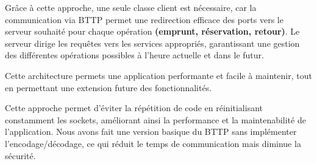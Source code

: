     \bigskip

    Grâce à cette approche, une seule classe client est nécessaire, car la communication via BTTP permet une
    redirection efficace des ports vers le serveur souhaité pour chaque opération \textbf{(emprunt, réservation, retour)}.
    Le serveur dirige les requêtes vers les services appropriés, garantissant une gestion des différentes opérations
    possibles à l’heure actuelle et dans le futur.

    \bigskip

    Cette architecture permets une application
    performante et facile à maintenir, tout en permettant une extension future des fonctionnalités.

    \bigskip

    \bigskip

    Cette approche permet d'éviter la répétition de code en
    réinitialisant constamment les sockets, améliorant ainsi la performance et la maintenabilité de l'application.
    Nous avons fait une version basique du BTTP sans implémenter l’encodage/décodage, ce qui réduit le temps de
    communication mais diminue la sécurité.

    \clearpage
